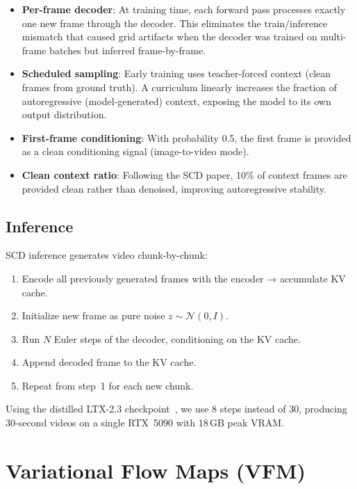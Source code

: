 \documentclass[10pt,twocolumn]{article}
\begin{document}
\begin{itemize}[nosep]
  \item \textbf{Per-frame decoder}: At training time, each forward pass processes exactly one new frame through the decoder. This eliminates the train/inference mismatch that caused grid artifacts when the decoder was trained on multi-frame batches but inferred frame-by-frame.
  \item \textbf{Scheduled sampling}: Early training uses teacher-forced context (clean frames from ground truth). A curriculum linearly increases the fraction of autoregressive (model-generated) context, exposing the model to its own output distribution.
  \item \textbf{First-frame conditioning}: With probability 0.5, the first frame is provided as a clean conditioning signal (image-to-video mode).
  \item \textbf{Clean context ratio}: Following the SCD paper, 10\% of context frames are provided clean rather than denoised, improving autoregressive stability.
\end{itemize}

\subsection{Inference}

SCD inference generates video chunk-by-chunk:

\begin{enumerate}[nosep]
  \item Encode all previously generated frames with the encoder → accumulate KV cache.
  \item Initialize new frame as pure noise $z \sim \mathcal{N}(0,I)$.
  \item Run $N$ Euler steps of the decoder, conditioning on the KV cache.
  \item Append decoded frame to the KV cache.
  \item Repeat from step~1 for each new chunk.
\end{enumerate}

Using the distilled LTX-2.3 checkpoint~\cite{ltx23}, we use 8 steps instead of 30, producing 30-second videos on a single RTX~5090 with 18\,GB peak VRAM.

\section{Variational Flow Maps (VFM)}
\label{sec:vfm}
\end{document}
